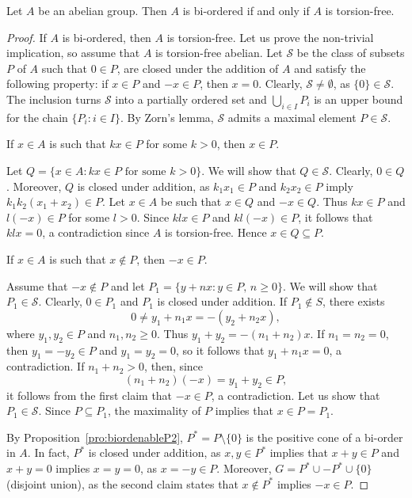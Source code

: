 \begin{theorem}[Levi]
	\label{thm:Levi}
	Let $A$ be an abelian group. Then $A$ is bi-ordered if and only
	if $A$ is torsion-free.
\end{theorem}

\begin{proof}
	If $A$ is bi-ordered, then $A$ is torsion-free. Let us prove the non-trivial implication, 
	so assume that
	$A$ is torsion-free abelian. Let $\mathcal{S}$ be the class 
	of subsets $P$ of $A$ such that $0\in P$, are closed under 
	the addition of
	$A$ and satisfy the following property: if $x\in P$ and $-x\in P$,
	then $x=0$.
	Clearly, $\mathcal{S}\ne\emptyset$, as 
	$\{0\}\in\mathcal{S}$.  The inclusion turns $\mathcal{S}$ into a partially ordered set  
	and $\bigcup_{i\in I}P_i$ is an upper bound for the chain 
	$\{P_i:i\in I\}$. By Zorn's lemma, 
	$\mathcal{S}$ admits a maximal element $P\in\mathcal{S}$.

	\begin{claim}
		If $x\in A$ is such that $kx\in P$ for some $k>0$, then  $x\in P$.		
	\end{claim}

	Let $Q=\{x\in A:kx\in P\text{ for some 
	$k>0$}\}$. We will show that $Q\in\mathcal{S}$.  Clearly, $0\in Q$. Moreover, $Q$
	is closed under addition, as $k_1x_1\in P$ and $k_2x_2\in P$ imply 
	$k_1k_2(x_1+x_2)\in P$. Let $x\in A$ be such that $x\in Q$ and $-x\in Q$. Thus 
	$kx\in P$ and $l(-x)\in P$ for some $l>0$. Since $klx\in P$ and 
	$kl(-x)\in P$, it follows that $klx=0$, a contradiction since $A$ is torsion-free. 
	Hence $x\in Q\subseteq P$. 

	\begin{claim}
		If $x\in A$ is such that $x\not\in P$, then $-x\in P$. 	
	\end{claim}

	Assume that $-x\not\in P$ and let $P_1=\{y+nx:y\in P,\,n\geq0\}$. We will
	show that  $P_1\in\mathcal{S}$.  Clearly, $0\in P_1$ and $P_1$ is closed under
	addition. If $P_1\not\in S$, there exists 
	\[
		0\ne y_1+n_1x=-(y_2+n_2x),
	\]
	where $y_1,y_2\in P$ and $n_1,n_2\geq0$. Thus $y_1+y_2=-(n_1+n_2)x$. If 
	$n_1=n_2=0$, then $y_1=-y_2\in P$ and $y_1=y_2=0$, so it follows that
	$y_1+n_1x=0$, a contradiction. If $n_1+n_2>0$, then, since 
	\[
		(n_1+n_2)(-x)=y_1+y_2\in P,
	\]
	it follows from the first claim that $-x\in P$, a contradiction. 
	Let us show that $P_1\in\mathcal{S}$. 
	Since $P\subseteq P_1$, the maximality of $P$ implies that 
	$x\in P=P_1$.

	\medskip
	By Proposition~\ref{pro:biordenableP2}, 
	$P^*=P\setminus\{0\}$ is the positive cone of a bi-order in $A$. 
	In fact, $P^*$ is closed under addition, as $x,y\in
	P^*$ implies that $x+y\in P$ and $x+y=0$ implies $x=y=0$, as $x=-y\in P$. Moreover,
	$G=P^*\cup -P^*\cup\{0\}$ (disjoint union), as 
	the second claim states that $x\not\in P^*$ implies 
	$-x\in P$. 
\end{proof}

